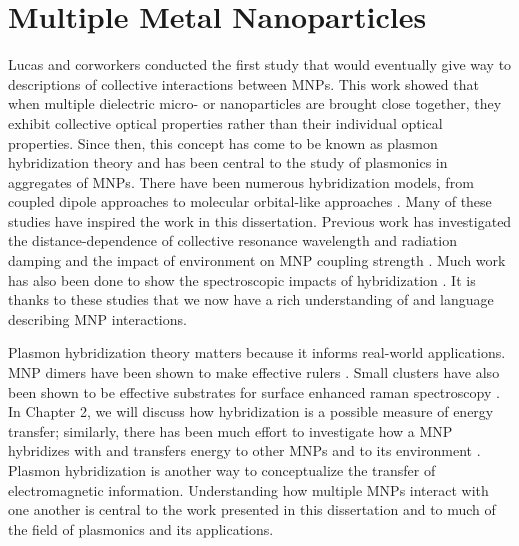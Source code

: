 \documentclass [11pt, proquest] {uwthesis}[2016/11/22]
\begin{document}
\section{Multiple Metal Nanoparticles}

Lucas and corworkers \cite{Lucas1976} conducted the first study that would eventually give way to descriptions of collective interactions between MNPs. This work showed that when multiple dielectric micro- or nanoparticles are brought close together, they exhibit collective optical properties rather than their individual optical properties. Since then, this concept has come to be known as plasmon hybridization theory and has been central to the study of plasmonics in aggregates of MNPs. There have been numerous hybridization models, from coupled dipole approaches \cite{Schatz2003} to molecular orbital-like approaches \cite{Oubre2004,NordProdan2004}. Many of these studies have inspired the work in this dissertation. Previous work has investigated the distance-dependence of collective resonance wavelength and radiation damping \cite{vonPlessen2007} and the impact of environment on MNP coupling strength \cite{Elsayed2008}. Much work has also been done to show the spectroscopic impacts of hybridization \cite{Xu1995,Mischenko1995}. It is thanks to these studies that we now have a rich understanding of and language describing MNP interactions. 

Plasmon hybridization theory matters because it informs real-world applications. MNP dimers have been shown to make effective rulers \cite{Ruler}. Small clusters have also been shown to be effective substrates for surface enhanced raman spectroscopy \cite{SERS}. In Chapter 2, we will discuss how hybridization is a possible measure of energy transfer; similarly, there has been much effort to investigate how a MNP hybridizes with and transfers energy to other MNPs and to its environment \cite{CubeSubstrate,ARAVIND1981,ThakkarLandau}. Plasmon hybridization is another way to conceptualize the transfer of electromagnetic information. Understanding how multiple MNPs interact with one another is central to the work presented in this dissertation and to much of the field of plasmonics and its applications.
\end{document}
